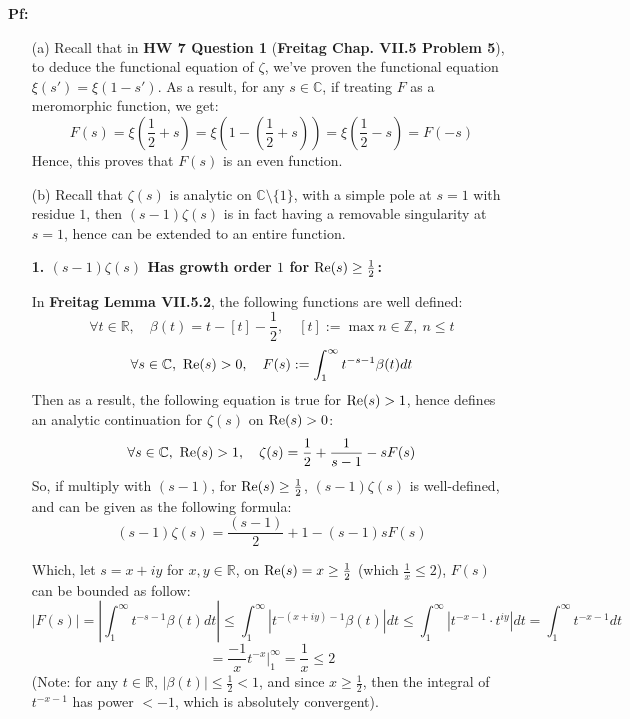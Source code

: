 \documentclass{article}
\begin{document}
\textbf{Pf:}
\begin{itemize}
    \item[(a)] Recall that in \textbf{HW 7 Question 1} (\textbf{Freitag Chap. VII.5 Problem 5}), to deduce the functional equation of $\zeta$, we've proven the functional equation $\xi(s')=\xi(1-s')$. As a result, for any $s\in\mathbb{C}$, if treating $F$ as a meromorphic function, we get:
    $$F(s)=\xi\left(\frac{1}{2}+s\right) = \xi\left(1-\left(\frac{1}{2}+s\right)\right) = \xi\left(\frac{1}{2}-s\right) = F(-s)$$
    Hence, this proves that $F(s)$ is an even function.

    \hfil

    \item[(b)] Recall that $\zeta(s)$ is analytic on $\mathbb{C}\setminus\{1\}$, with a simple pole at $s=1$ with residue $1$, then $(s-1)\zeta(s)$ is in fact having a removable singularity at $s=1$, hence can be extended to an entire function.
    
    \hfil

    \textbf{1. $(s-1)\zeta(s)$ Has growth order $1$ for $\textmd{Re}(s)\geq \frac{1}{2}$:}

    In \textbf{Freitag Lemma VII.5.2}, the following functions are well defined:
    $$\forall t\in\mathbb{R},\quad \beta(t)=t-[t]-\frac{1}{2},\quad [t]:=\max{n\in\mathbb{Z},\ n\leq t}$$
    $$\forall s\in\mathbb{C},\ \textmd{Re}(s)>0,\quad F(s):=\int_{1}^{\infty}t^{-s-1}\beta(t)dt$$
    Then as a result, the following equation is true for $\textmd{Re}(s)>1$, hence defines an analytic continuation for $\zeta(s)$ on $\textmd{Re}(s)>0$:
    $$\forall s\in\mathbb{C},\ \textmd{Re}(s)>1,\quad \zeta(s)=\frac{1}{2}+\frac{1}{s-1}-sF(s)$$
    So, if multiply with $(s-1)$, for $\textmd{Re}(s)\geq \frac{1}{2}$, $(s-1)\zeta(s)$ is well-defined, and can be given as the following formula:
    $$(s-1)\zeta(s)=\frac{(s-1)}{2}+1-(s-1)sF(s)$$

    Which, let $s = x+iy$ for $x,y\in\mathbb{R}$, on $\textmd{Re}(s) = x \geq \frac{1}{2}$ (which $\frac{1}{x}\leq 2$), $F(s)$ can be bounded as follow:
    $$|F(s)| = \left|\int_{1}^{\infty}t^{-s-1}\beta(t)dt\right| \leq \int_{1}^{\infty}|t^{-(x+iy)-1}\beta(t)|dt \leq \int_{1}^{\infty}|t^{-x-1}\cdot t^{iy}|dt = \int_{1}^{\infty}t^{-x-1}dt$$
    $$ = \frac{-1}{x}t^{-x}\bigg|_{1}^{\infty} = \frac{1}{x}\leq 2$$
    (Note: for any $t\in\mathbb{R}$, $|\beta(t)|\leq \frac{1}{2}<1$, and since $x\geq \frac{1}{2}$, then the integral of $t^{-x-1}$ has power $<-1$, which is absolutely convergent).


\end{itemize}
\end{document}
